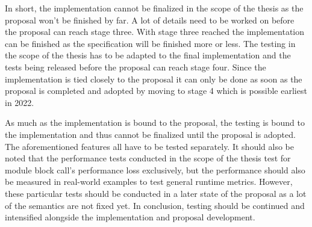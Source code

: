 In short, the implementation cannot be finalized in the scope of the thesis as the proposal won't be finished by far. A lot of details need to be worked on before the proposal can reach stage three. With stage three reached the implementation can be finished as the specification will be finished more or less. The testing in the scope of the thesis has to be adapted to the final implementation and the tests being released before the proposal can reach stage four. Since the implementation is tied closely to the proposal it can only be done as soon as the proposal is completed and adopted by moving to stage 4 which is possible earliest in 2022.

As much as the implementation is bound to the proposal, the testing is bound to the implementation and thus cannot be finalized until the proposal is adopted. The aforementioned features all have to be tested separately. It should also be noted that the performance tests conducted in the scope of the thesis test for module block call's performance loss exclusively, but the performance should also be measured in real-world examples to test general runtime metrics. However, these particular tests should be conducted in a later state of the proposal as a lot of the semantics are not fixed yet. In conclusion, testing should be continued and intensified alongside the implementation and proposal development.
